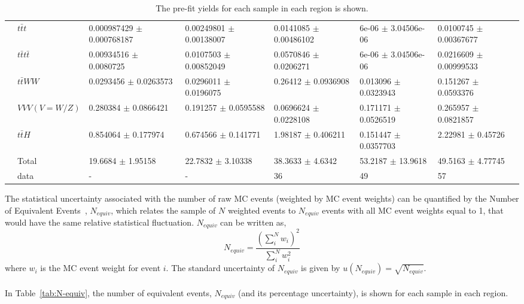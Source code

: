 \begin{table}[h!]
{\begin{tabular}{|ll|l|l|l|l|l|}
\multicolumn{1}{|l|}{}                       & $t\bar{t}t$          & 0.000987429 $\pm$ 0.000768187 & 0.00249801 $\pm$ 0.00138007 & 0.0141085 $\pm$ 0.00486102 & 6e-06 $\pm$ 3.04506e-06     & 0.0100745 $\pm$ 0.00367677 \\
\multicolumn{1}{|l|}{}                       & $t\bar{t}t\bar{t}$         & 0.00934516 $\pm$ 0.0080725    & 0.0107503 $\pm$ 0.00852049  & 0.0570846 $\pm$ 0.0206271  & 6e-06 $\pm$ 3.04506e-06     & 0.0216609 $\pm$ 0.00999533 \\
\multicolumn{1}{|l|}{}                       & $t\bar{t}WW$         & 0.0293456 $\pm$ 0.0263573     & 0.0296011 $\pm$ 0.0196075   & 0.26412 $\pm$ 0.0936908    & 0.013096 $\pm$ 0.0323943    & 0.151267 $\pm$ 0.0593376   \\
\multicolumn{1}{|l|}{}                       & $VVV (V = W/Z)$           & 0.280384 $\pm$ 0.0866421      & 0.191257 $\pm$ 0.0595588    & 0.0696624 $\pm$ 0.0228108  & 0.171171 $\pm$ 0.0526519    & 0.265957 $\pm$ 0.0821857   \\
\multicolumn{1}{|l|}{}                       & $t\bar{t}H$          & 0.854064 $\pm$ 0.177974       & 0.674566 $\pm$ 0.141771     & 1.98187 $\pm$ 0.406211     & 0.151447 $\pm$ 0.0357703    & 2.22981 $\pm$ 0.45726      \\ \hline
                                             & Total        & 19.6684 $\pm$ 1.95158         & 22.7832 $\pm$ 3.10338       & 38.3633 $\pm$ 4.6342       & 53.2187 $\pm$ 13.9618       & 49.5163 $\pm$ 4.77745      \\ \hline
                                             & data         & -                                         & -                                       & 36                                      & 49                                       & 57                                      \\ \hline
\end{tabular}}
\caption{The pre-fit yields for each sample in each region is shown.}
\label{tab:4Lep-PreFit-Yields}
\end{table}


The statistical uncertainty associated with the number of raw MC events (weighted by MC event weights) can be quantified by the Number of Equivalent Events~\cite{N_equiv_Derivation}, $N_{equiv}$, which relates the sample of $N$ weighted events to $N_{equiv}$ events with all MC event weights equal to 1, that would have the same relative statistical fluctuation. $N_{equiv}$ can be written as,
\begin{equation}
N_{equiv} = \frac{ (\sum_{i}^{N} w_{i})^2  }{\sum_{i}^{N} w_i^2 }
\end{equation}
where $w_i$ is the MC event weight for event $i$. The standard uncertainty of $N_{equiv}$ is given by $u(N_{equiv}) = \sqrt{N_{equiv}}$.\\\\
In Table~\ref{tab:N-equiv}, the number of equivalent events, $N_{equiv}$ (and its percentage uncertainty), is shown for each sample in each region. 

